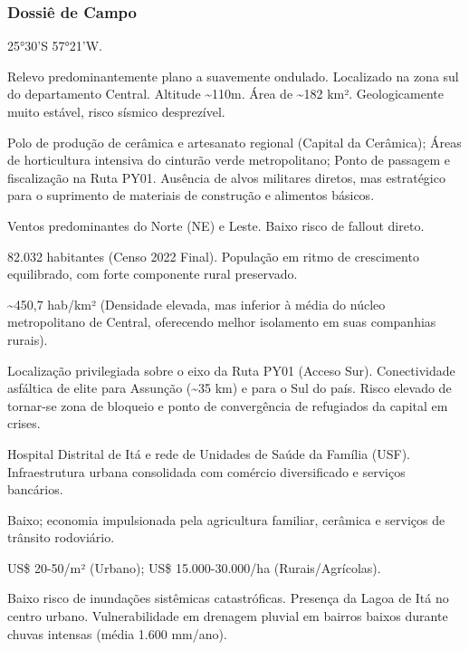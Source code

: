 \subsubsection{Dossiê de Campo}
\begin{description}[style=nextline,leftmargin=0.5cm,font=\bfseries]
\item[Coordenadas]  25°30'S 57°21'W.
\item[Topografia]  Relevo predominantemente plano a suavemente ondulado. Localizado na zona sul do departamento Central. Altitude \textasciitilde 110m. Área de \textasciitilde 182 km². Geologicamente muito estável, risco sísmico desprezível.
\item[Alvos Estratégicos]  Polo de produção de cerâmica e artesanato regional (Capital da Cerâmica); Áreas de horticultura intensiva do cinturão verde metropolitano; Ponto de passagem e fiscalização na Ruta PY01. Ausência de alvos militares diretos, mas estratégico para o suprimento de materiais de construção e alimentos básicos.
\item[Fallout]  Ventos predominantes do Norte (NE) e Leste. Baixo risco de fallout direto.
\item[População]  82.032 habitantes (Censo 2022 Final). População em ritmo de crescimento equilibrado, com forte componente rural preservado.
\item[Densidade]  \textasciitilde 450,7 hab/\allowbreak km² (Densidade elevada, mas inferior à média do núcleo metropolitano de Central, oferecendo melhor isolamento em suas companhias rurais).
\item[Vias de Acesso]  Localização privilegiada sobre o eixo da Ruta PY01 (Acceso Sur). Conectividade asfáltica de elite para Assunção (\textasciitilde 35 km) e para o Sul do país. Risco elevado de tornar-se zona de bloqueio e ponto de convergência de refugiados da capital em crises.
\item[Serviços]  Hospital Distrital de Itá e rede de Unidades de Saúde da Família (USF). Infraestrutura urbana consolidada com comércio diversificado e serviços bancários.
\item[Custo de Vida]  Baixo; economia impulsionada pela agricultura familiar, cerâmica e serviços de trânsito rodoviário.
\item[Preço da Terra]  US\$ 20-50/\allowbreak m² (Urbano); US\$ 15.000-30.000/\allowbreak ha (Rurais/\allowbreak Agrícolas).
\item[Hidrologia]  Baixo risco de inundações sistêmicas catastróficas. Presença da Lagoa de Itá no centro urbano. Vulnerabilidade em drenagem pluvial em bairros baixos durante chuvas intensas (média 1.600 mm/\allowbreak ano).

\end{description}
